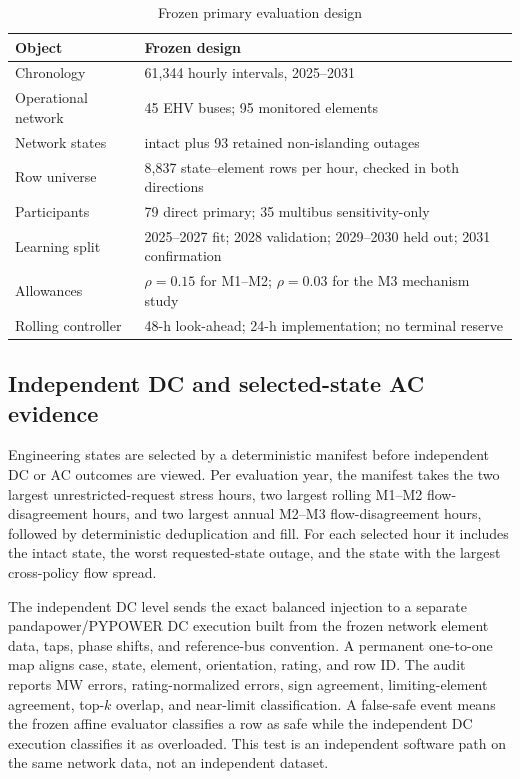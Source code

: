 \documentclass[10pt,journal]{IEEEtran}
\begin{document}
\begin{table}[t]
\caption{Frozen primary evaluation design}
\label{tab:design}
\centering
\footnotesize
\begin{tabularx}{\columnwidth}{@{}lX@{}}
\toprule
Object & Frozen design \\
\midrule
Chronology & 61,344 hourly intervals, 2025--2031 \\
Operational network & 45 EHV buses; 95 monitored elements \\
Network states & intact plus 93 retained non-islanding outages \\
Row universe & 8,837 state--element rows per hour, checked in both directions \\
Participants & 79 direct primary; 35 multibus sensitivity-only \\
Learning split & 2025--2027 fit; 2028 validation; 2029--2030 held out; 2031 confirmation \\
Allowances & $\rho=0.15$ for M1--M2; $\rho=0.03$ for the M3 mechanism study \\
Rolling controller & 48-h look-ahead; 24-h implementation; no terminal reserve \\
\bottomrule
\end{tabularx}
\end{table}

\subsection{Independent DC and selected-state AC evidence}

Engineering states are selected by a deterministic manifest before independent DC or AC outcomes are viewed. Per evaluation year, the manifest takes the two largest unrestricted-request stress hours, two largest rolling M1--M2 flow-disagreement hours, and two largest annual M2--M3 flow-disagreement hours, followed by deterministic deduplication and fill. For each selected hour it includes the intact state, the worst requested-state outage, and the state with the largest cross-policy flow spread.

The independent DC level sends the exact balanced injection to a separate pandapower/PYPOWER DC execution built from the frozen network element data, taps, phase shifts, and reference-bus convention. A permanent one-to-one map aligns case, state, element, orientation, rating, and row ID. The audit reports MW errors, rating-normalized errors, sign agreement, limiting-element agreement, top-$k$ overlap, and near-limit classification. A false-safe event means the frozen affine evaluator classifies a row as safe while the independent DC execution classifies it as overloaded. This test is an independent software path on the same network data, not an independent dataset.
\end{document}
